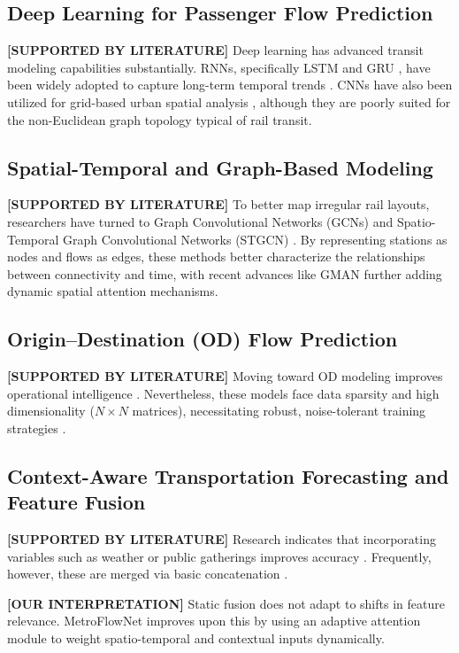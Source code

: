 \documentclass[conference]{IEEEtran}
\begin{document}
\subsection{Deep Learning for Passenger Flow Prediction}
\noindent \textbf{[SUPPORTED BY LITERATURE]} Deep learning has advanced transit modeling capabilities substantially. RNNs, specifically LSTM \cite{hochreiter1997long} and GRU \cite{cho2014learning}, have been widely adopted to capture long-term temporal trends \cite{fu2016using}. CNNs have also been utilized for grid-based urban spatial analysis \cite{zhang2017deep}, although they are poorly suited for the non-Euclidean graph topology typical of rail transit.

\subsection{Spatial-Temporal and Graph-Based Modeling}
\noindent \textbf{[SUPPORTED BY LITERATURE]} To better map irregular rail layouts, researchers have turned to Graph Convolutional Networks (GCNs) and Spatio-Temporal Graph Convolutional Networks (STGCN) \cite{yu2018spatio, li2017diffusion, zhao2019t}. By representing stations as nodes and flows as edges, these methods better characterize the relationships between connectivity and time, with recent advances like GMAN \cite{zheng2020gman} further adding dynamic spatial attention mechanisms.

\subsection{Origin--Destination (OD) Flow Prediction}
\noindent \textbf{[SUPPORTED BY LITERATURE]} Moving toward OD modeling improves operational intelligence \cite{toque2016short, gong2020online}. Nevertheless, these models face data sparsity and high dimensionality ($N \times N$ matrices), necessitating robust, noise-tolerant training strategies \cite{gong2020online}.

\subsection{Context-Aware Transportation Forecasting and Feature Fusion}
\noindent \textbf{[SUPPORTED BY LITERATURE]} Research indicates that incorporating variables such as weather or public gatherings improves accuracy \cite{liao2018deep, yao2018deep}. Frequently, however, these are merged via basic concatenation \cite{yao2018deep}.

\noindent \textbf{[OUR INTERPRETATION]} Static fusion does not adapt to shifts in feature relevance. MetroFlowNet improves upon this by using an adaptive attention module to weight spatio-temporal and contextual inputs dynamically.
\end{document}
